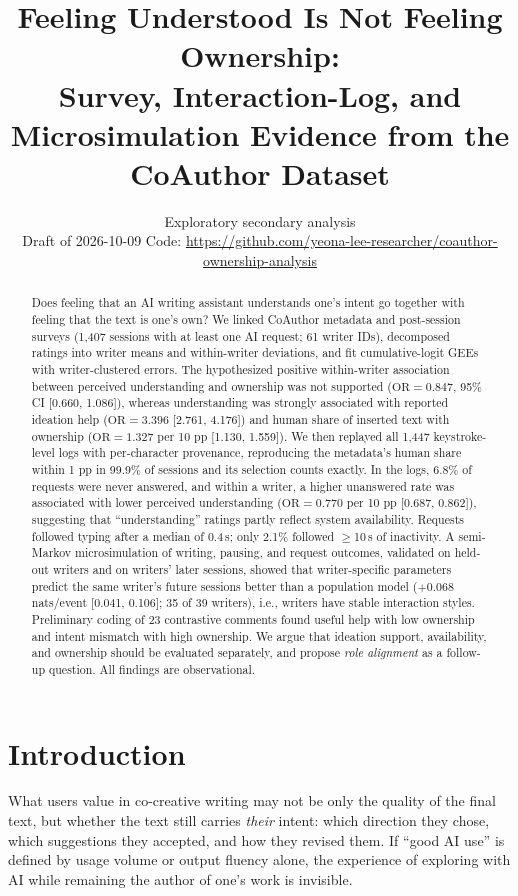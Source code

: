 \documentclass[10pt]{article}
\title{\textbf{Feeling Understood Is Not Feeling Ownership:}\\
\large Survey, Interaction-Log, and Microsimulation Evidence from the CoAuthor Dataset}
\author{Exploratory secondary analysis\\
\small Draft of 2026-10-09 \quad Code: \url{https://github.com/yeona-lee-researcher/coauthor-ownership-analysis}}
\date{}
\newcommand{\OR}{\mathrm{OR}}
\begin{document}
\maketitle

\begin{abstract}
\noindent
Does feeling that an AI writing assistant understands one's intent go together with feeling that the text is one's own?
We linked CoAuthor metadata and post-session surveys (1,407 sessions with at least one AI request; 61 writer IDs), decomposed ratings into writer means and within-writer deviations, and fit cumulative-logit GEEs with writer-clustered errors.
The hypothesized positive within-writer association between perceived understanding and ownership was not supported ($\OR=0.847$, 95\% CI [0.660, 1.086]), whereas understanding was strongly associated with reported ideation help ($\OR=3.396$ [2.761, 4.176]) and human share of inserted text with ownership ($\OR=1.327$ per 10 pp [1.130, 1.559]).
We then replayed all 1,447 keystroke-level logs with per-character provenance, reproducing the metadata's human share within 1 pp in 99.9\% of sessions and its selection counts exactly.
In the logs, 6.8\% of requests were never answered, and within a writer, a higher unanswered rate was associated with lower perceived understanding ($\OR=0.770$ per 10 pp [0.687, 0.862]), suggesting that ``understanding'' ratings partly reflect system availability.
Requests followed typing after a median of 0.4\,s; only 2.1\% followed $\geq$10\,s of inactivity.
A semi-Markov microsimulation of writing, pausing, and request outcomes, validated on held-out writers and on writers' later sessions, showed that writer-specific parameters predict the same writer's future sessions better than a population model (+0.068 nats/event [0.041, 0.106]; 35 of 39 writers), i.e., writers have stable interaction styles.
Preliminary coding of 23 contrastive comments found useful help with low ownership and intent mismatch with high ownership.
We argue that ideation support, availability, and ownership should be evaluated separately, and propose \emph{role alignment} as a follow-up question. All findings are observational.
\end{abstract}

\section{Introduction}
What users value in co-creative writing may not be only the quality of the final text, but whether the text still carries \emph{their} intent: which direction they chose, which suggestions they accepted, and how they revised them.
If ``good AI use'' is defined by usage volume or output fluency alone, the experience of exploring with AI while remaining the author of one's work is invisible.
\end{document}
